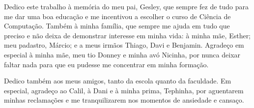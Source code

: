 Dedico este trabalho à memória do meu pai, Gesley, que sempre fez de tudo
para me dar uma boa educação e me incentivou a escolher o curso de Ciência
de Computação. Também à minha família, que sempre me ajuda em tudo que
preciso e não deixa de demonstrar interesse em minha vida: à minha
mãe, Esther; meu padastro, Márcio; e a meus irmãos Thiago, Davi e
Benjamin. Agradeço em especial à minha mãe, meu tio Donney e minha avó
Nicinha, por nunca deixar faltar nada para que eu pudesse me concentrar em
minha formação.

Dedico também aos meus amigos, tanto da escola quanto da faculdade. Em
especial, agradeço ao Calil, à Dani e à minha prima, Tephinha, por
aguentarem minhas reclamações e me tranquilizarem nos momentos de
ansiedade e cansaço.
